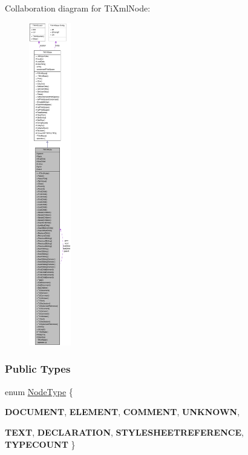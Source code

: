 Collaboration diagram for TiXmlNode:\nopagebreak
\begin{figure}[H]
\begin{center}
\leavevmode
\includegraphics[height=400pt]{class_ti_xml_node__coll__graph}
\end{center}
\end{figure}
\subsubsection*{Public Types}
\begin{DoxyCompactItemize}
\item 
enum \hyperlink{class_ti_xml_node_a836eded4920ab9e9ef28496f48cd95a2}{NodeType} \{ \par
{\bfseries DOCUMENT}, 
{\bfseries ELEMENT}, 
{\bfseries COMMENT}, 
{\bfseries UNKNOWN}, 
\par
{\bfseries TEXT}, 
{\bfseries DECLARATION}, 
{\bfseries STYLESHEETREFERENCE}, 
{\bfseries TYPECOUNT}
 \}
\end{DoxyCompactItemize}

